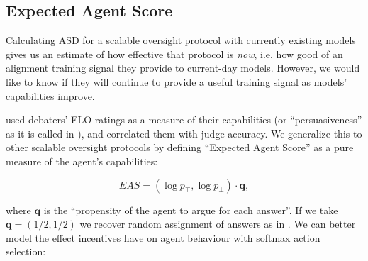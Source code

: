 



\subsection{Expected Agent Score}
\label{sec:eas}

Calculating ASD for a scalable oversight protocol with currently existing models gives us an estimate of how effective that protocol is \emph{now}, i.e. how good of an alignment training signal they provide to current-day models. However, we would like to know if they will continue to provide a useful training signal as models' capabilities improve.

\Previouswork{} used debaters' ELO ratings as a measure of their capabilities (or ``persuasiveness'' as it is called in \citet{khanDebatingMorePersuasive2024}), and correlated them with judge accuracy. We generalize this to other scalable oversight protocols by defining ``Expected Agent Score'' as a pure measure of the agent's capabilities:

\[EAS=(\log p_\top,\log p_\bot)\cdot\mathbf{q},\]

where $\mathbf{q}$ is the ``propensity of the agent to argue for each answer''. If we take $\mathbf{q}=(1/2,1/2)$ we recover random assignment of answers as in \previouswork{}. We can better model the effect incentives have on agent behaviour with softmax action selection:

